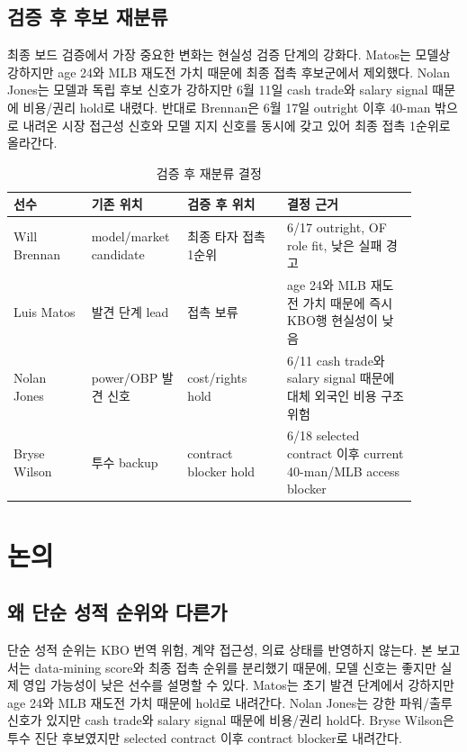 \documentclass[11pt,a4paper]{article}
\begin{document}
\subsection{검증 후 후보 재분류}
최종 보드 검증에서 가장 중요한 변화는 현실성 검증 단계의 강화다. Matos는 모델상 강하지만 age 24와 MLB 재도전 가치 때문에 최종 접촉 후보군에서 제외했다. Nolan Jones는 모델과 독립 후보 신호가 강하지만 6월 11일 cash trade와 salary signal 때문에 비용/권리 hold로 내렸다. 반대로 Brennan은 6월 17일 outright 이후 40-man 밖으로 내려온 시장 접근성 신호와 모델 지지 신호를 동시에 갖고 있어 최종 접촉 1순위로 올라간다.

\begin{table}[H]
\centering
\caption{검증 후 재분류 결정}
\label{tab:validation_reclass}
\small
\begin{tabularx}{\linewidth}{L{0.18\linewidth}L{0.18\linewidth}L{0.23\linewidth}L{0.30\linewidth}}
\toprule
선수 & 기존 위치 & 검증 후 위치 & 결정 근거 \\
\midrule
Will Brennan & model/market candidate & 최종 타자 접촉 1순위 & 6/17 outright, OF role fit, 낮은 실패 경고 \\
Luis Matos & 발견 단계 lead & 접촉 보류 & age 24와 MLB 재도전 가치 때문에 즉시 KBO행 현실성이 낮음 \\
Nolan Jones & power/OBP 발견 신호 & cost/rights hold & 6/11 cash trade와 salary signal 때문에 대체 외국인 비용 구조 위험 \\
Bryse Wilson & 투수 backup & contract blocker hold & 6/18 selected contract 이후 current 40-man/MLB access blocker \\
\bottomrule
\end{tabularx}
\end{table}

\section{논의}

\subsection{왜 단순 성적 순위와 다른가}
단순 성적 순위는 KBO 번역 위험, 계약 접근성, 의료 상태를 반영하지 않는다. 본 보고서는 data-mining score와 최종 접촉 순위를 분리했기 때문에, 모델 신호는 좋지만 실제 영입 가능성이 낮은 선수를 설명할 수 있다. Matos는 초기 발견 단계에서 강하지만 age 24와 MLB 재도전 가치 때문에 hold로 내려간다. Nolan Jones는 강한 파워/출루 신호가 있지만 cash trade와 salary signal 때문에 비용/권리 hold다. Bryse Wilson은 투수 진단 후보였지만 selected contract 이후 contract blocker로 내려간다.
\end{document}
